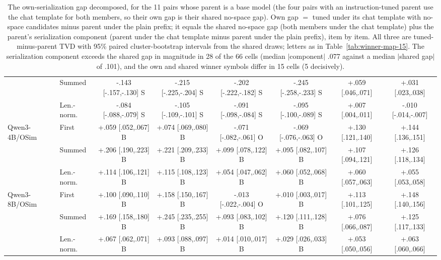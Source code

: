 \begin{table}[t]
\begin{tabular}{@{}llcccccc@{}}
 & Summed & -.143 [-.157,-.130] S & -.215 [-.225,-.204] S & -.202 [-.222,-.182] S & -.245 [-.258,-.233] S & +.059 [.046,.071] & +.031 [.023,.038] \\
 & Len.-norm. & -.084 [-.088,-.079] S & -.105 [-.109,-.101] S & -.091 [-.098,-.084] S & -.095 [-.100,-.089] S & +.007 [.004,.011] & -.010 [-.014,-.007] \\
\addlinespace[1pt]
Qwen3-4B/OSim & First & +.059 [.052,.067] B & +.074 [.069,.080] B & -.071 [-.082,-.061] O & -.069 [-.076,-.063] O & +.130 [.121,.140] & +.144 [.136,.151] \\
 & Summed & +.206 [.190,.223] B & +.221 [.209,.233] B & +.099 [.078,.122] B & +.095 [.082,.107] B & +.107 [.094,.121] & +.126 [.118,.134] \\
 & Len.-norm. & +.114 [.106,.121] B & +.115 [.108,.123] B & +.054 [.047,.062] B & +.060 [.052,.068] B & +.060 [.057,.063] & +.055 [.053,.058] \\
\addlinespace[1pt]
Qwen3-8B/OSim & First & +.100 [.090,.110] B & +.158 [.150,.167] B & -.013 [-.022,-.004] O & +.010 [.003,.017] B & +.113 [.101,.125] & +.148 [.140,.156] \\
 & Summed & +.169 [.158,.180] B & +.245 [.235,.255] B & +.093 [.083,.102] B & +.120 [.111,.128] B & +.076 [.066,.087] & +.125 [.117,.133] \\
 & Len.-norm. & +.067 [.062,.071] B & +.093 [.088,.097] B & +.014 [.010,.017] B & +.029 [.026,.033] B & +.053 [.050,.056] & +.063 [.060,.066] \\
\bottomrule
\end{tabular}
\caption{The own-serialization gap decomposed, for the 11 pairs whose parent is a base model (the four pairs with an instruction-tuned parent use the chat template for both members, so their own gap is their shared no-space gap). Own gap $=$ tuned under its chat template with no-space candidates minus parent under the plain prefix; it equals the shared no-space gap (both members under the chat template) plus the parent's serialization component (parent under the chat template minus parent under the plain prefix), item by item. All three are tuned-minus-parent TVD with 95\% paired cluster-bootstrap intervals from the shared draws; letters as in Table~\ref{tab:winner-map-15}. The serialization component exceeds the shared gap in magnitude in 28 of the 66 cells (median $|$component$|$ .077 against a median $|$shared gap$|$ of .101), and the own and shared winner symbols differ in 15 cells (5 decisively).}
\label{tab:own-decomp}
\end{table}
